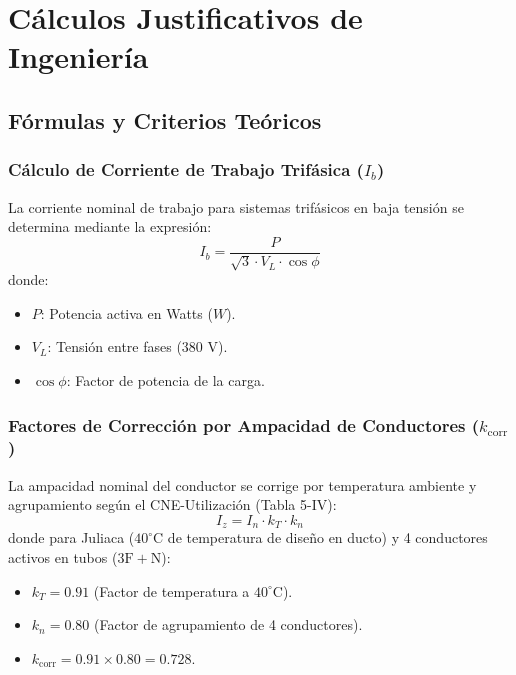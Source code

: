 \chapter{Cálculos Justificativos de Ingeniería}

\section{Fórmulas y Criterios Teóricos}

\subsection{Cálculo de Corriente de Trabajo Trifásica ($I_b$)}
La corriente nominal de trabajo para sistemas trifásicos en baja tensión se determina mediante la expresión:
\begin{equation}
I_b = \frac{P}{\sqrt{3} \cdot V_L \cdot \cos\phi}
\end{equation}
donde:
\begin{itemize}
    \item $P$: Potencia activa en Watts ($W$).
    \item $V_L$: Tensión entre fases ($380\text{ V}$).
    \item $\cos\phi$: Factor de potencia de la carga.
\end{itemize}

\subsection{Factores de Corrección por Ampacidad de Conductores ($k_{\text{corr}}$)}
La ampacidad nominal del conductor se corrige por temperatura ambiente y agrupamiento según el CNE-Utilización (Tabla 5-IV):
\begin{equation}
I_z = I_n \cdot k_T \cdot k_n
\end{equation}
donde para Juliaca ($40^\circ\text{C}$ de temperatura de diseño en ducto) y 4 conductores activos en tubos ($3\text{F}+\text{N}$):
\begin{itemize}
    \item $k_T = 0.91$ (Factor de temperatura a $40^\circ\text{C}$).
    \item $k_n = 0.80$ (Factor de agrupamiento de 4 conductores).
    \item $k_{\text{corr}} = 0.91 \times 0.80 = 0.728$.
\end{itemize}

